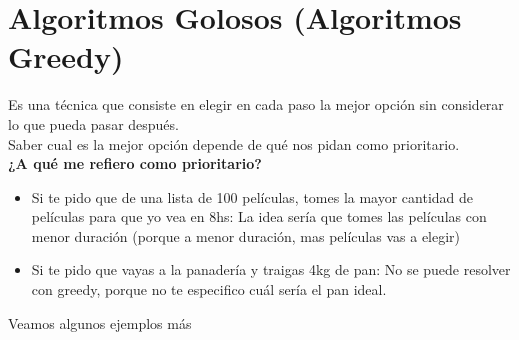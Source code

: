 \documentclass[10pt,a4paper]{article}
\begin{document}
\section*{Algoritmos Golosos (Algoritmos Greedy)}
Es una técnica que consiste en elegir en cada paso la mejor opción sin considerar lo que pueda pasar después. \\
Saber cual es la mejor opción depende de qué nos pidan como prioritario. \\
\textbf{¿A qué me refiero como prioritario?}
\begin{itemize}
    \item Si te pido que de una lista de 100 películas, tomes la mayor cantidad de películas para que yo vea en 8hs: La idea sería que tomes las películas con menor duración (porque a menor duración, mas películas vas a elegir)
    \item Si te pido que vayas a la panadería y traigas 4kg de pan: No se puede resolver con greedy, porque no te especifico cuál sería el pan ideal.
\end{itemize}
Veamos algunos ejemplos más
\end{document}
